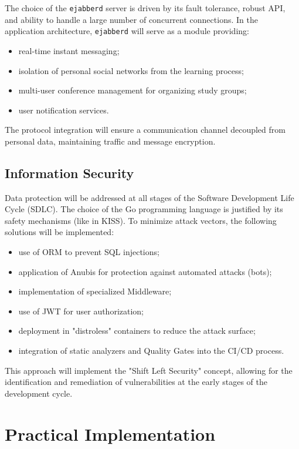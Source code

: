 \documentclass[a4paper, 14pt]{extreport}
\begin{document}
The choice of the \texttt{ejabberd} server is driven by its fault tolerance, robust API, and ability to handle a large number of concurrent connections. In the application architecture, \texttt{ejabberd} will serve as a module providing:
\begin{itemize}
	\item real-time instant messaging;
	\item isolation of personal social networks from the learning process;
	\item multi-user conference management for organizing study groups;
	\item user notification services.
\end{itemize}
The protocol integration will ensure a communication channel decoupled from personal data, maintaining traffic and message encryption.

\section{Information Security}
Data protection will be addressed at all stages of the Software Development Life Cycle (SDLC). The choice of the Go programming language is justified by its safety mechanisms (like in KISS). To minimize attack vectors, the following solutions will be implemented:
\begin{itemize}
	\item use of ORM to prevent SQL injections;
	\item application of Anubis for protection against automated attacks (bots);
	\item implementation of specialized Middleware;
	\item use of JWT for user authorization;
	\item deployment in "distroless" containers to reduce the attack surface;
	\item integration of static analyzers and Quality Gates into the CI/CD process.
\end{itemize}
This approach will implement the "Shift Left Security" concept, allowing for the identification and remediation of vulnerabilities at the early stages of the development cycle.

\chapter{Practical Implementation}
\end{document}
